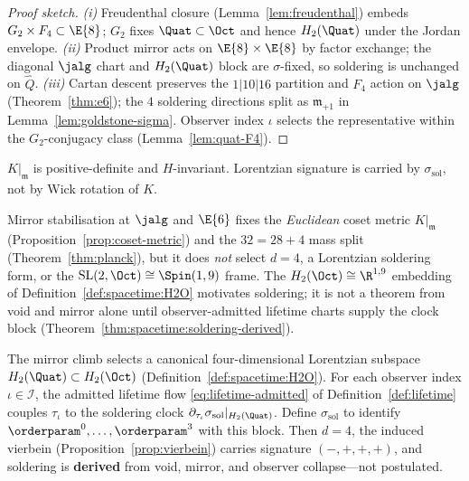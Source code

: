 \begin{proof}[Proof sketch]
\emph{(i)} Freudenthal closure (Lemma~\ref{lem:freudenthal}) embeds
$G_2\times F_4\subset\E{8}$; $G_2$ fixes $\Quat\subset\Oct$ and hence
$H_2(\Quat)$ under the Jordan envelope. \emph{(ii)} Product mirror acts on
$\E{8}\times\E{8}$ by factor exchange; the diagonal $\jalg$ chart and
$H_2(\Quat)$ block are $\sigma$-fixed, so soldering is unchanged on
$\hat Q$. \emph{(iii)} Cartan descent preserves the $1|10|16$ partition and
$F_4$ action on $\jalg$ (Theorem~\ref{thm:e6}); the $4$ soldering directions
split as $\mathfrak{m}_{+1}$ in Lemma~\ref{lem:goldstone-sigma}. Observer
index $\iota$ selects the representative within the $G_2$-conjugacy class
(Lemma~\ref{lem:quat-F4}).
\end{proof}

\begin{proposition}\label{prop:coset-metric}
$K|_{\mathfrak{m}}$ is positive-definite and $H$-invariant. Lorentzian
signature is carried by $\sigma_{\mathrm{sol}}$, not by Wick rotation of $K$.
\end{proposition}

\begin{proposition}\label{prop:coset-nogo}
Mirror stabilisation at $\jalg$ and $\E{6}$ fixes the \emph{Euclidean}
coset metric $K|_{\mathfrak{m}}$ (Proposition~\ref{prop:coset-metric}) and
the $32=28+4$ mass split (Theorem~\ref{thm:planck}), but it does \emph{not}
select $d=4$, a Lorentzian soldering form, or the
$\mathrm{SL}(2,\Oct)\cong\Spin(1,9)$ frame. The $H_2(\Oct)\cong\R^{1,9}$
embedding of Definition~\ref{def:spacetime:H2O} motivates soldering; it is
not a theorem from void and mirror alone until observer-admitted lifetime
charts supply the clock block (Theorem~\ref{thm:spacetime:soldering-derived}).
\end{proposition}

\begin{theorem}
\label{thm:spacetime:soldering-derived}
The mirror climb selects a canonical four-dimensional Lorentzian subspace
$H_2(\Quat)\subset H_2(\Oct)$ (Definition~\ref{def:spacetime:H2O}). For each
observer index $\iota\in\mathcal{I}$, the admitted lifetime flow
\eqref{eq:lifetime-admitted} of Definition~\ref{def:lifetime} couples
$\tau_\iota$ to the soldering clock
$\partial_{\tau_\iota}\sigma_{\mathrm{sol}}|_{H_2(\Quat)}$. Define
$\sigma_{\mathrm{sol}}$ to identify
$\orderparam^0,\ldots,\orderparam^3$ with this block. Then $d=4$, the
induced vierbein (Proposition~\ref{prop:vierbein}) carries signature
$(-,+,+,+)$, and soldering is \textbf{derived} from void, mirror, and
observer collapse---not postulated.
\end{theorem}

